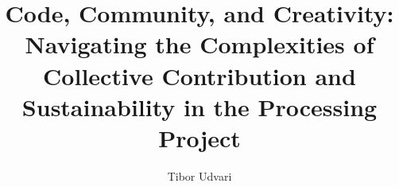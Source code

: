 \title{Code, Community, and Creativity: Navigating the Complexities of Collective Contribution and Sustainability in the Processing Project}
\author{Tibor Udvari}

\newcommand{\myTitle}{Code, Community, and Creativity: Navigating the Complexities of Collective Contribution and Sustainability in the Processing Project}
\newcommand{\myAuthor}{Tibor Udvari}
\newcommand{\myShortTitle}{
    Code, Community, and Creativity in Processing
}
\newcommand{\myAbstract}{
    This thesis examines the establishment and evolution of the Processing community, focusing on the interplay of software development practices and contributor motivations within this open-source ecosystem. Since its 2001 inception, the community, comprising artists, designers, and programmers, has been explored through interviews, archival research, and a detailed analysis of the software development cycle. The study employs Wenger's Communities of Practice framework to contextualize the community's formation, particularly highlighting the role of a user-friendly interface, mutual engagement, and situated learning. Furthermore, it scrutinizes the software development practices through the lens of the Cathedral and the Bazaar model, shedding light on its open-source methodology and the diverse motivations of contributors across economic, social, and technological dimensions. While acknowledging the transformations the community experienced with growth, the thesis primarily concentrates on the factors driving its initial formation and sustainability. The insights gleaned offer valuable implications for developing and maintaining other open-source creative tools.
}







